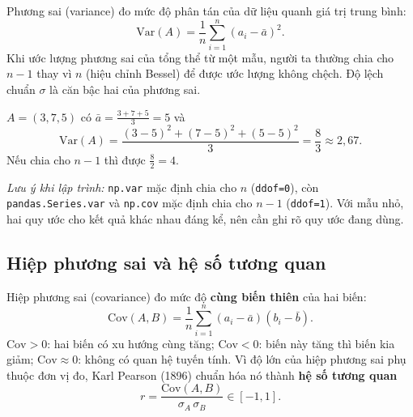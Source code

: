 \begin{definition}
Phương sai (variance) đo mức độ phân tán của dữ liệu quanh giá trị trung bình:
\begin{equation}
    \mathrm{Var}(A) = \frac{1}{n}\sum_{i=1}^{n}(a_i - \bar{a})^2 .
\end{equation}
Khi ước lượng phương sai của tổng thể từ một mẫu, người ta thường chia cho $n - 1$ thay vì $n$ (hiệu chỉnh Bessel) để được ước lượng không chệch. Độ lệch chuẩn $\sigma$ là căn bậc hai của phương sai.
\end{definition}

\begin{example}
$A = (3, 7, 5)$ có $\bar{a} = \frac{3 + 7 + 5}{3} = 5$ và
\[
    \mathrm{Var}(A) = \frac{(3 - 5)^2 + (7 - 5)^2 + (5 - 5)^2}{3} = \frac{8}{3} \approx 2{,}67 .
\]
Nếu chia cho $n - 1$ thì được $\frac{8}{2} = 4$.
\end{example}

\noindent\textit{Lưu ý khi lập trình:} \texttt{np.var} mặc định chia cho $n$ (\texttt{ddof=0}), còn \texttt{pandas.Series.var} và \texttt{np.cov} mặc định chia cho $n - 1$ (\texttt{ddof=1}). Với mẫu nhỏ, hai quy ước cho kết quả khác nhau đáng kể, nên cần ghi rõ quy ước đang dùng.

\subsection{Hiệp phương sai và hệ số tương quan}

\begin{definition}
Hiệp phương sai (covariance) đo mức độ \textbf{cùng biến thiên} của hai biến:
\begin{equation}
    \mathrm{Cov}(A, B) = \frac{1}{n}\sum_{i=1}^{n}(a_i - \bar{a})(b_i - \bar{b}).
\end{equation}
$\mathrm{Cov} > 0$: hai biến có xu hướng cùng tăng; $\mathrm{Cov} < 0$: biến này tăng thì biến kia giảm; $\mathrm{Cov} \approx 0$: không có quan hệ tuyến tính. Vì độ lớn của hiệp phương sai phụ thuộc đơn vị đo, Karl Pearson (1896) chuẩn hóa nó thành \textbf{hệ số tương quan}
\begin{equation}
    r = \frac{\mathrm{Cov}(A, B)}{\sigma_A\,\sigma_B} \in [-1, 1].
\end{equation}
\end{definition}

